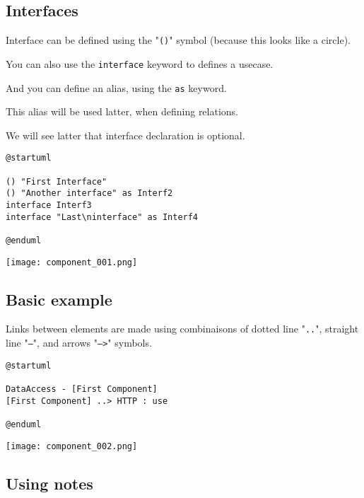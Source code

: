 \newpage \subsection{Interfaces}

\begin{description}
\item Interface can be defined using the "\texttt{()}" symbol (because this
looks like a circle).
\item You can also use the \texttt{interface} keyword to defines a usecase.
\item And you can define an alias, using the \texttt{as} keyword.
\item This alias will be used latter, when defining relations.
\item We will see latter that interface declaration is optional.
\end{description}

\begin{lstlisting}
@startuml

() "First Interface"
() "Another interface" as Interf2
interface Interf3
interface "Last\ninterface" as Interf4

@enduml
\end{lstlisting}

\begin{center}
\texttt{[image: component\_001.png]}
\end{center}


\newpage \subsection{Basic example}
Links between elements are made using combinaisons of dotted line
"\texttt{..}", straight line "\texttt{--}", and arrows "\texttt{-->}" symbols.

\begin{lstlisting}
@startuml

DataAccess - [First Component] 
[First Component] ..> HTTP : use

@enduml
\end{lstlisting}

\begin{center}
\texttt{[image: component\_002.png]}
\end{center}

\newpage \subsection{Using notes}

